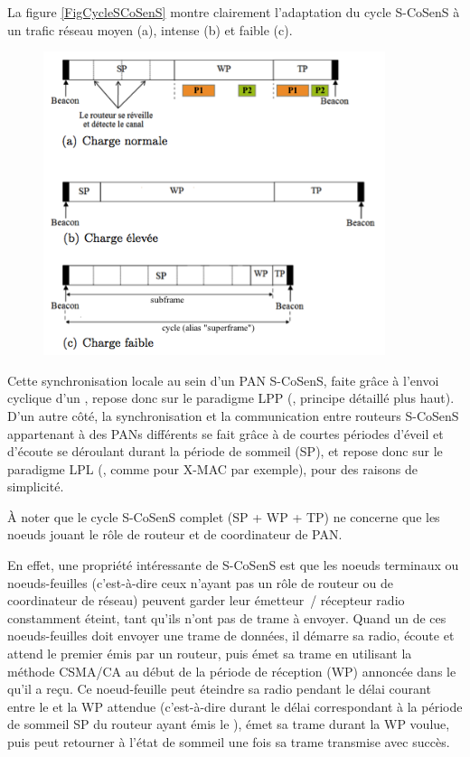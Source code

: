 La figure \vref{FigCycleSCoSenS} montre clairement l'adaptation
du cycle S-CoSenS à un trafic réseau moyen (a), intense (b) et faible (c).

\begin{figure}[!hbt]
\centering
\includegraphics[width=10cm]{images/ch3-s-cosens-cycle.png}
\label{FigCycleSCoSenS}
\end{figure}

Cette synchronisation locale au sein d'un PAN S-CoSenS, faite grâce
à l'envoi cyclique d'un , repose donc sur le paradigme
LPP (, principe détaillé plus haut). D'un
autre côté, la synchronisation et la communication entre routeurs
S-CoSenS appartenant à des PANs différents se fait grâce à de courtes
périodes d'éveil et d'écoute se déroulant durant la période de sommeil
(SP), et repose donc sur le paradigme LPL (,
comme pour X-MAC par exemple), pour des raisons de simplicité.

À noter que le cycle S-CoSenS complet (SP + WP + TP) ne concerne que
les noeuds jouant le rôle de routeur et de coordinateur de PAN.

En effet, une propriété intéressante de S-CoSenS est que les noeuds
terminaux ou noeuds-feuilles (c'est-à-dire ceux n'ayant pas un rôle de
routeur ou de coordinateur de réseau) peuvent garder leur émetteur~/
récepteur radio constamment éteint, tant qu'ils n'ont pas de trame
à envoyer. Quand un de ces noeuds-feuilles doit envoyer une trame de
données, il démarre sa radio, écoute et attend le premier 
émis par un routeur, puis émet sa trame en utilisant la méthode
CSMA/CA au début de la période de réception (WP) annoncée dans le
 qu'il a reçu. Ce noeud-feuille peut éteindre sa radio
pendant le délai courant entre le  et la WP attendue
(c'est-à-dire durant le délai correspondant à la période de sommeil
SP du routeur ayant émis le ), émet sa trame durant
la WP voulue, puis peut retourner à l'état de sommeil une fois sa
trame transmise avec succès.

